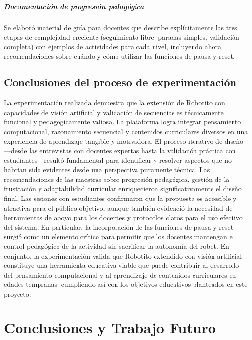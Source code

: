 \documentclass{prgrado}
\begin{document}
\paragraph{Documentación de progresión pedagógica} Se elaboró material de guía para docentes que describe explícitamente las tres etapas de complejidad creciente (seguimiento libre, paradas simples, validación completa) con ejemplos de actividades para cada nivel, incluyendo ahora recomendaciones sobre cuándo y cómo utilizar las funciones de pausa y reset.
\section{Conclusiones del proceso de experimentación}
La experimentación realizada demuestra que la extensión de Robotito con capacidades de visión artificial y validación de secuencias es técnicamente funcional y pedagógicamente valiosa. La plataforma logra integrar pensamiento computacional, razonamiento secuencial y contenidos curriculares diversos en una experiencia de aprendizaje tangible y motivadora.
El proceso iterativo de diseño---desde las entrevistas con docentes expertas hasta la validación práctica con estudiantes---resultó fundamental para identificar y resolver aspectos que no habrían sido evidentes desde una perspectiva puramente técnica. Las recomendaciones de las maestras sobre progresión pedagógica, gestión de la frustración y adaptabilidad curricular enriquecieron significativamente el diseño final.
Las sesiones con estudiantes confirmaron que la propuesta es accesible y atractiva para el público objetivo, aunque también evidenció la necesidad de herramientas de apoyo para los docentes y protocolos claros para el uso efectivo del sistema. En particular, la incorporación de las funciones de pausa y reset surgió como un elemento crítico para permitir que los docentes mantengan el control pedagógico de la actividad sin sacrificar la autonomía del robot.
En conjunto, la experimentación valida que Robotito extendido con visión artificial constituye una herramienta educativa viable que puede contribuir al desarrollo del pensamiento computacional y al aprendizaje de contenidos curriculares en edades tempranas, cumpliendo así con los objetivos educativos planteados en este proyecto.


\chapter{Conclusiones y Trabajo Futuro}
\end{document}
